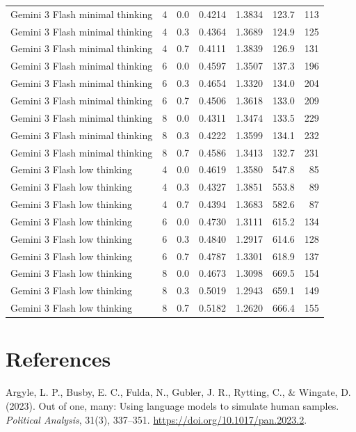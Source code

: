 \documentclass[11pt]{article}
\begin{document}
\begin{longtable}{L{1.75in}rrrrrr}
Gemini 3 Flash minimal thinking & 4 & 0.0 & 0.4214 & 1.3834 & 123.7 & 113 \\
Gemini 3 Flash minimal thinking & 4 & 0.3 & 0.4364 & 1.3689 & 124.9 & 125 \\
Gemini 3 Flash minimal thinking & 4 & 0.7 & 0.4111 & 1.3839 & 126.9 & 131 \\
Gemini 3 Flash minimal thinking & 6 & 0.0 & 0.4597 & 1.3507 & 137.3 & 196 \\
Gemini 3 Flash minimal thinking & 6 & 0.3 & 0.4654 & 1.3320 & 134.0 & 204 \\
Gemini 3 Flash minimal thinking & 6 & 0.7 & 0.4506 & 1.3618 & 133.0 & 209 \\
Gemini 3 Flash minimal thinking & 8 & 0.0 & 0.4311 & 1.3474 & 133.5 & 229 \\
Gemini 3 Flash minimal thinking & 8 & 0.3 & 0.4222 & 1.3599 & 134.1 & 232 \\
Gemini 3 Flash minimal thinking & 8 & 0.7 & 0.4586 & 1.3413 & 132.7 & 231 \\
Gemini 3 Flash low thinking & 4 & 0.0 & 0.4619 & 1.3580 & 547.8 & 85 \\
Gemini 3 Flash low thinking & 4 & 0.3 & 0.4327 & 1.3851 & 553.8 & 89 \\
Gemini 3 Flash low thinking & 4 & 0.7 & 0.4394 & 1.3683 & 582.6 & 87 \\
Gemini 3 Flash low thinking & 6 & 0.0 & 0.4730 & 1.3111 & 615.2 & 134 \\
Gemini 3 Flash low thinking & 6 & 0.3 & 0.4840 & 1.2917 & 614.6 & 128 \\
Gemini 3 Flash low thinking & 6 & 0.7 & 0.4787 & 1.3301 & 618.9 & 137 \\
Gemini 3 Flash low thinking & 8 & 0.0 & 0.4673 & 1.3098 & 669.5 & 154 \\
Gemini 3 Flash low thinking & 8 & 0.3 & 0.5019 & 1.2943 & 659.1 & 149 \\
Gemini 3 Flash low thinking & 8 & 0.7 & 0.5182 & 1.2620 & 666.4 & 155 \\
\bottomrule
\end{longtable}
\normalsize

\section*{References}

\noindent Argyle, L. P., Busby, E. C., Fulda, N., Gubler, J. R., Rytting, C.,
\& Wingate, D. (2023). Out of one, many: Using language models to simulate human
samples. \emph{Political Analysis}, 31(3), 337--351.
\url{https://doi.org/10.1017/pan.2023.2}.
\end{document}
